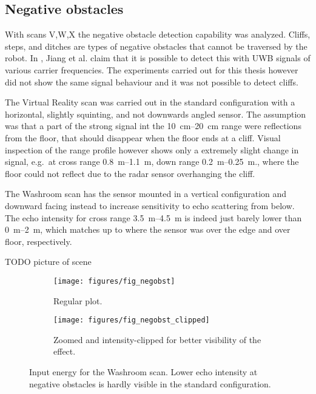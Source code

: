 \subsection{Negative obstacles}\label{negative-obstacles}

With scans V,W,X the negative obstacle detection capability was
analyzed. Cliffs, steps, and ditches are types of negative obstacles
that cannot be traversed by the robot. In \cite{Jiang2015}, Jiang et al.
claim that it is possible to detect this with UWB signals of various
carrier frequencies. The experiments carried out for this thesis however
did not show the same signal behaviour and it was not possible to detect
cliffs.

The Virtual Reality scan was carried out in the standard configuration
with a horizontal, slightly squinting, and not downwards angled sensor.
The assumption was that a part of the strong signal int the \SIrange{10}{20}{cm}
range were reflections from the floor, that should disappear when the
floor ends at a cliff. Visual inspection of the range profile however
shows only a extremely slight change in signal, e.g.~at cross range
\SIrange{0.8}{1.1}{m}, down range \SIrange{0.2}{0.25}{m}., where the floor could not reflect
due to the radar sensor overhanging the cliff.

The Washroom scan has the sensor mounted in a vertical configuration and
downward facing instead to increase sensitivity to echo scattering from
below. The echo intensity for cross range \SIrange{3.5}{4.5}{m} is indeed just
barely lower than \SIrange{0}{2}{m}, which matches up to where the sensor was over
the edge and over floor, respectively.

TODO picture of scene

\begin{figure}[htbp]
    \centering
    \begin{subfigure}[t]{.475\textwidth}
        \texttt{[image: figures/fig\_negobst]}
        \caption{Regular plot.}
        \label{fig:negobst}
    \end{subfigure}%
    \hfill%
    \begin{subfigure}[t]{.475\textwidth}
        \texttt{[image: figures/fig\_negobst\_clipped]}
        \caption{Zoomed and intensity-clipped for better visibility of the effect.}
        \label{fig:negobst_clipped}
    \end{subfigure}
    \caption{Input energy for the Washroom scan. Lower echo intensity at negative obstacles is hardly visible in the standard configuration.}
\end{figure}

